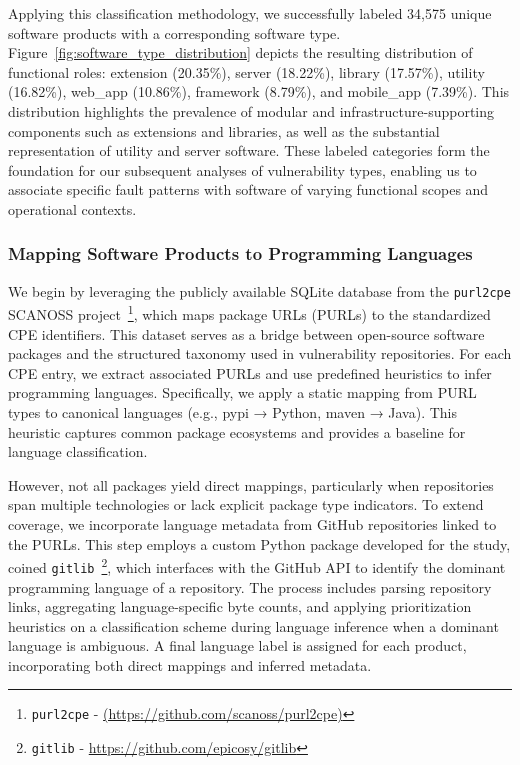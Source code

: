 Applying this classification methodology, we successfully labeled 34,575 unique software products with a corresponding software type. Figure~\ref{fig:software_type_distribution} depicts the resulting distribution of functional roles: extension (20.35\%), server (18.22\%), library (17.57\%), utility (16.82\%), web\_app (10.86\%), framework (8.79\%), and mobile\_app (7.39\%). This distribution highlights the prevalence of modular and infrastructure-supporting components such as extensions and libraries, as well as the substantial representation of utility and server software. These labeled categories form the foundation for our subsequent analyses of vulnerability types, enabling us to associate specific fault patterns with software of varying functional scopes and operational contexts.


\subsubsection{Mapping Software Products to Programming Languages}
We begin by leveraging the publicly available SQLite database from the  \texttt{purl2cpe} SCANOSS project~\footnote{\texttt{purl2cpe} - \url{(https://github.com/scanoss/purl2cpe)}}, which maps package URLs (PURLs) to the standardized \ac{CPE} identifiers. This dataset serves as a bridge between open-source software packages and the structured taxonomy used in vulnerability repositories. For each CPE entry, we extract associated PURLs and use predefined heuristics to infer programming languages. Specifically, we apply a static mapping from PURL types to canonical languages (e.g., pypi → Python, maven → Java). This heuristic captures common package ecosystems and provides a baseline for language classification.

However, not all packages yield direct mappings, particularly when repositories span multiple technologies or lack explicit package type indicators. To extend coverage, we incorporate language metadata from GitHub repositories linked to the PURLs. This step employs a custom Python package developed for the study, coined \texttt{gitlib}~\footnote{\texttt{gitlib} - \url{https://github.com/epicosy/gitlib}}, which interfaces with the GitHub API to identify the dominant programming language of a repository. The process includes parsing repository links, aggregating language-specific byte counts, and applying prioritization heuristics on a classification scheme during language inference when a dominant language is ambiguous. A final language label is assigned for each product, incorporating both direct mappings and inferred metadata.

